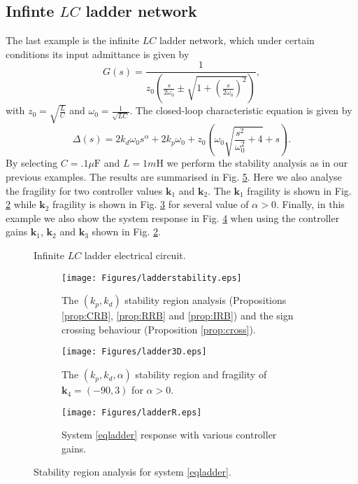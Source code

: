 \documentclass[twoside,reqno,11pt]{fcaa-var} %
\begin{document}
\subsection{Infinte $LC$ ladder network}
The last example is the infinite $LC$ ladder network, which under certain conditions its input admittance is given by \cite{Kelly2009,Klimo_2016}
\begin{equation}
G(s)=\frac{1}{z_0\left(\frac{s}{2\omega_0}\pm\sqrt{1+\left(\frac{s}{2\omega_0}\right)^2}\right)}, \label{eqladder}
\end{equation}
with $z_0=\sqrt{\frac{L}{C}}$ and $\omega_0=\frac{1}{\sqrt{LC}}$. The closed-loop characteristic equation is given by
\begin{equation}
\Delta(s)=2k_d\omega_0 s^{\alpha}+2k_p\omega_0+z_0 \left(\omega_0 \sqrt{\frac{s^2}{\omega_0^2}+4}+s\right).
\end{equation}
By selecting $C=.1\mu\text{F}$ and $L=1m\text{H}$ we perform the stability analysis as in our previous examples. The results are summarised in Fig. \ref{ladderstability}. Here we also analyse the fragility for two controller values $\bm{k}_1$ and $\bm{k}_2$. The $\bm{k}_1$ fragility is shown in Fig. \ref{laddera} while $\bm{k}_2$ fragility is shown in Fig. \ref{ladderc} for several value of $\alpha>0$.  Finally, in this example we also show the system response in Fig. \ref{ladderb} when using the controller gains $\bm{k}_1$, $\bm{k}_2$ and $\bm{k}_3$ shown in Fig. \ref{laddera}.
\begin{figure}
	\centering
	\begin{adjustbox}{max width=\columnwidth}
		
	\end{adjustbox}
	\caption{Infinite $LC$ ladder electrical circuit.} \label{infladder}
\end{figure}
\begin{figure}%
	\centering %
	\begin{subfigure}[b]{0.48\columnwidth}
		\centering
		\texttt{[image: Figures/ladderstability.eps]}
		\caption{The $(k_p,k_d)$ stability region analysis (Propositions \ref{prop:CRB}, \ref{prop:RRB} and \ref{prop:IRB}) and  the sign crossing behaviour (Proposition \ref{prop:cross}).}
		\label{laddera}
	\end{subfigure}
	\hfill
	\begin{subfigure}[b]{0.48\columnwidth}
		\centering
		\texttt{[image: Figures/ladder3D.eps]}
		\caption{The $(k_p,k_d,\alpha)$ stability region and fragility of $\bm{k}_4=(-90,3)$ for $\alpha>0$. }
		\label{ladderc}
	\end{subfigure}
	\hfill
	\begin{subfigure}[b]{0.48\columnwidth}
		\centering
		\texttt{[image: Figures/ladderR.eps]}
		\caption{System \eqref{eqladder} response with various controller gains.}
		\label{ladderb}
	\end{subfigure}
	\caption{Stability region analysis for system \eqref{eqladder}.}\label{ladderstability}
\end{figure}
\end{document}
